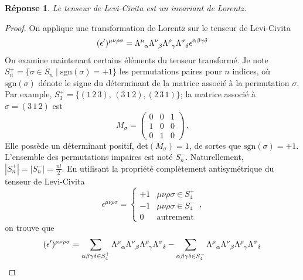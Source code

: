 \documentclass{article}
\numberwithin{equation}{section}
\theoremstyle{solution}
\newtheorem{solution}{Réponse}[section]
\begin{document}

\begin{solution}
        Le tenseur de Levi-Civita est un invariant de Lorentz.
\end{solution}
\begin{proof}
On applique une transformation de Lorentz sur le tenseur de Levi-Civita
\begin{align*}
        (\epsilon')^{\mu\nu\rho\sigma} = \Lambda\indices{^{\mu}_{\alpha}} \Lambda\indices{^{\nu}_{\beta}} \Lambda\indices{^{\rho}_{\gamma}} \Lambda\indices{^{\sigma}_{\delta}} \epsilon^{\alpha\beta\gamma\delta }
\end{align*} 
On examine maintenant certains éléments du tenseur transformé. Je note $S_n^{+} = \{\sigma \in S_n \mid \mathrm{sgn}(\sigma) = +1\}$ les permutations paires 
pour $n$ indices, où $\mathrm{sgn}(\sigma)$ dénote le signe du déterminant de la matrice associé à la permutation $\sigma$.
Par example, $S_3^{+} = \{(1\, 2\, 3),\, (3\, 1\, 2), (2\, 3\, 1)\}$; la matrice associé 
à $\sigma = (3\, 1\, 2)$ est
\begin{equation*}
M_{\sigma} = \begin{pmatrix}
        0 & 0 & 1 \\
        1 & 0 & 0 \\
        0 & 1 & 0
\end{pmatrix}\, .
\end{equation*} 
Elle possède un déterminant positif, $\mathrm{det}(M_\sigma) = 1$, de sortes que $\mathrm{sgn}(\sigma) = +1$. 
L'ensemble des permutations impaires est noté $S_n^{-}$. Naturellement, $|S_n^{+}| = |S_n^{-}| = \frac{n!}{2}$. 
En utilisant la propriété complètement 
antisymétrique du tenseur de Levi-Civita
\begin{equation}
        \epsilon^{\mu\nu\rho\sigma} = \begin{cases}
                +1 & \mu\nu\rho\sigma \in S_4^{+} \\
                -1 & \mu\nu\rho\sigma \in S_4^{-} \\
                0 & \mathrm{autrement}

        \end{cases}\, ,
\end{equation} 
on trouve que
\begin{equation}
        (\epsilon')^{\mu\nu\rho\sigma} = 
        \sum_{\alpha\beta\gamma\delta \in S_4^{+}} 
 \Lambda\indices{^{\mu}_{\alpha}} \Lambda\indices{^{\nu}_{\beta}} \Lambda\indices{^{\rho}_{\gamma}} \Lambda\indices{^{\sigma}_{\delta}} 
-
        \sum_{\alpha\beta\gamma\delta \in S_4^{-}} 
 \Lambda\indices{^{\mu}_{\alpha}} \Lambda\indices{^{\nu}_{\beta}} \Lambda\indices{^{\rho}_{\gamma}} \Lambda\indices{^{\sigma}_{\delta}} 
\end{equation} 


\end{proof}
\end{document}
